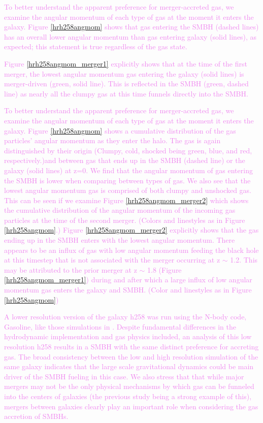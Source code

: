 \documentclass[manuscript]{aastex}
\begin{document}
\textcolor{violet}{
To better understand the apparent preference for merger-accreted gas, we examine the angular momentum of each type of gas at the moment it enters the galaxy. Figure \ref{hrh258angmom} shows that gas entering the SMBH (dashed lines) has an overall lower angular momentum than gas entering galaxy (solid lines), as expected; this statement is true regardless of the gas state. 
}

\textcolor{violet}{
Figure \ref{hrh258angmom_merger1} explicitly shows that at the time of the first merger, the lowest angular momentum gas entering the galaxy (solid lines) is merger-driven (green, solid line). This is reflected in the SMBH (green, dashed line) as nearly all the clumpy gas at this time funnels directly into the SMBH.
}

\textcolor{violet}{
To better understand the apparent preference for merger-accreted gas, we examine the angular momentum of each type of gas at the moment it enters the galaxy. Figure \ref{hrh258angmom} shows a cumulative distribution of the gas particles' angular momentum as they enter the halo. The gas is again distinguished by their origin (Clumpy, cold, shocked being green, blue, and red, respectively.)and between gas that ends up in the SMBH (dashed line) or the galaxy (solid lines) at z=0. We find that the angular momentum of gas entering the SMBH is lower when comparing between types of gas. We also see that the lowest angular momentum gas is comprised of both clumpy and unshocked gas. This can be seen if we examine Figure \ref{hrh258angmom_merger2} which shows the cumulative distribution of the angular momentum of the incoming gas particles at the time of the second merger. (Colors and linestyles as in Figure \ref{hrh258angmom}.) Figure \ref{hrh258angmom_merger2} explicitly shows that the gas ending up in the SMBH enters with the lowest angular momentum. There appears to be an influx of gas with low angular momentum feeding the black hole at this timestep that is not associated with the merger occurring at z $\sim$ 1.2. This may be attributed to the prior merger at z $\sim$ 1.8 (Figure \ref{hrh258angmom_merger1}) during and after which a large influx of low angular momentum gas enters the galaxy and SMBH. (Color and linestyles as in Figure \ref{hrh258angmom}) 
}

\textcolor{violet}{
A lower resolution version of the galaxy h258 was run using the N-body code, Gasoline, like those simulations in \cite{Bellovary2013}. Despite fundamental differences in the hydrodynamic implementation and gas physics included, an analysis of this low resolution h258 results in a SMBH with the same distinct preference for accreting gas. The broad consistency between the low and high resolution simulation of the same galaxy indicates that the large scale gravitational dynamics could be main driver of the SMBH fueling in this case. We also stress that that while major mergers may not be the only physical mechanisms by which gas can be funneled into the centers of galaxies (the previous study being a strong example of this), mergers between galaxies clearly play an important role when considering the gas accretion of SMBHs.
}
\end{document}
